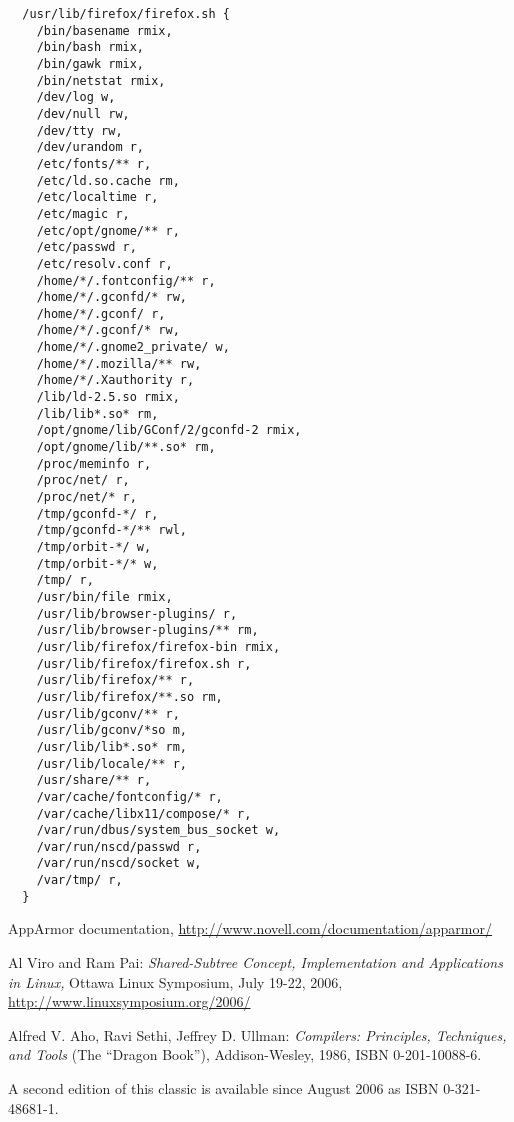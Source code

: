 \documentclass[a4paper]{article}
\begin{document}
\begin{small}
\begin{verbatim}
  /usr/lib/firefox/firefox.sh {
    /bin/basename rmix,
    /bin/bash rmix,
    /bin/gawk rmix,
    /bin/netstat rmix,
    /dev/log w,
    /dev/null rw,
    /dev/tty rw,
    /dev/urandom r,
    /etc/fonts/** r,
    /etc/ld.so.cache rm,
    /etc/localtime r,
    /etc/magic r,
    /etc/opt/gnome/** r,
    /etc/passwd r,
    /etc/resolv.conf r,
    /home/*/.fontconfig/** r,
    /home/*/.gconfd/* rw,
    /home/*/.gconf/ r,
    /home/*/.gconf/* rw,
    /home/*/.gnome2_private/ w,
    /home/*/.mozilla/** rw,
    /home/*/.Xauthority r,
    /lib/ld-2.5.so rmix,
    /lib/lib*.so* rm,
    /opt/gnome/lib/GConf/2/gconfd-2 rmix,
    /opt/gnome/lib/**.so* rm,
    /proc/meminfo r,
    /proc/net/ r,
    /proc/net/* r,
    /tmp/gconfd-*/ r,
    /tmp/gconfd-*/** rwl,
    /tmp/orbit-*/ w,
    /tmp/orbit-*/* w,
    /tmp/ r,
    /usr/bin/file rmix,
    /usr/lib/browser-plugins/ r,
    /usr/lib/browser-plugins/** rm,
    /usr/lib/firefox/firefox-bin rmix,
    /usr/lib/firefox/firefox.sh r,
    /usr/lib/firefox/** r,
    /usr/lib/firefox/**.so rm,
    /usr/lib/gconv/** r,
    /usr/lib/gconv/*so m,
    /usr/lib/lib*.so* rm,
    /usr/lib/locale/** r,
    /usr/share/** r,
    /var/cache/fontconfig/* r,
    /var/cache/libx11/compose/* r,
    /var/run/dbus/system_bus_socket w,
    /var/run/nscd/passwd r,
    /var/run/nscd/socket w,
    /var/tmp/ r,
  }
\end{verbatim}
\end{small}


\begin{thebibliography}{XX}

AppArmor documentation,
\url{http://www.novell.com/documentation/apparmor/}

Al Viro and Ram Pai:
{\em Shared-Subtree Concept, Implementation and Applications in Linux,}
Ottawa Linux Symposium, July 19-22, 2006,
\url{http://www.linuxsymposium.org/2006/}

Alfred V. Aho, Ravi Sethi, Jeffrey D. Ullman:
{\em Compilers: Principles, Techniques, and Tools}
(The ``Dragon Book''), Addison-Wesley, 1986, ISBN 0-201-10088-6.

A second edition of this classic is available since August 2006 as
ISBN 0-321-48681-1.

\end{thebibliography}
\end{document}
